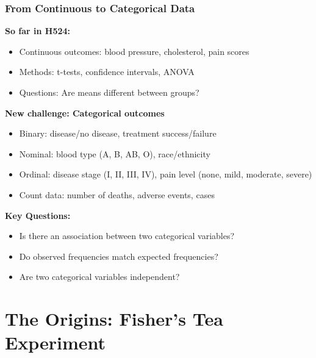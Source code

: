 \documentclass{beamer}
\begin{document}
\begin{frame}
\frametitle{From Continuous to Categorical Data}
\textbf{So far in H524:}
\begin{itemize}
\item Continuous outcomes: blood pressure, cholesterol, pain scores
\item Methods: t-tests, confidence intervals, ANOVA
\item Questions: Are means different between groups?
\end{itemize}

\vspace{0.5cm}
\textbf{New challenge: Categorical outcomes}
\begin{itemize}
\item Binary: disease/no disease, treatment success/failure
\item Nominal: blood type (A, B, AB, O), race/ethnicity
\item Ordinal: disease stage (I, II, III, IV), pain level (none, mild, moderate, severe)
\item Count data: number of deaths, adverse events, cases
\end{itemize}

\vspace{0.5cm}
\textbf{Key Questions:}
\begin{itemize}
\item Is there an association between two categorical variables?
\item Do observed frequencies match expected frequencies?
\item Are two categorical variables independent?
\end{itemize}
\end{frame}

\section{The Origins: Fisher's Tea Experiment}
\end{document}

